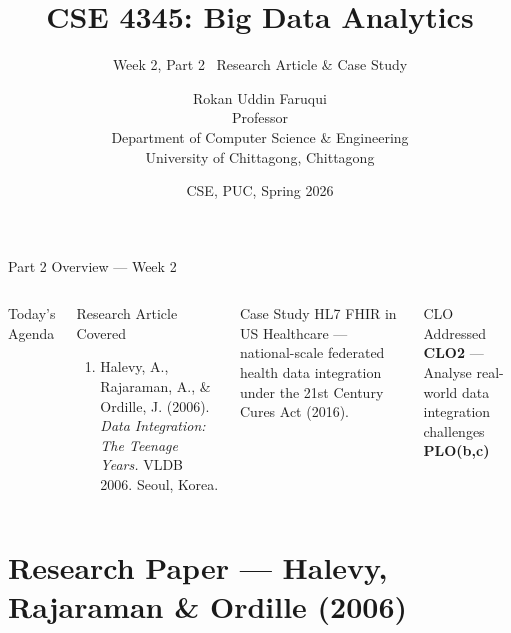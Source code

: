\documentclass[aspectratio=169,10pt]{beamer}
\title[CSE 4345 \textbar{} Week 2, Part 2]{CSE 4345: Big Data Analytics}
\subtitle{Week 2, Part 2 \textemdash\ Research Article \& Case Study}
\author[Dept.\ of CSE]{Rokan Uddin Faruqui \\ Professor \\ Department of Computer Science \& Engineering\\[4pt]
       \small University of Chittagong, Chittagong}
\institute{}
\date{CSE, PUC, Spring 2026}
\begin{document}

\begin{frame}
  \titlepage
\end{frame}

\begin{frame}{Part 2 Overview — Week 2}
  \begin{columns}[T]
      \begin{block}{Today's Agenda}
        \tableofcontents
      \end{block}

      \begin{exampleblock}{Research Article Covered}
        \begin{enumerate}
          \item Halevy, A., Rajaraman, A., \& Ordille, J. (2006).
                \textit{Data Integration: The Teenage Years.}
                VLDB 2006. Seoul, Korea.
        \end{enumerate}
      \end{exampleblock}
      \vspace{6pt}
      \begin{alertblock}{Case Study}
        HL7 FHIR in US Healthcare — national-scale federated health
        data integration under the 21st Century Cures Act (2016).
      \end{alertblock}
      \vspace{4pt}
      \begin{block}{CLO Addressed}
        \textbf{CLO2} — Analyse real-world data integration challenges\\
        \textbf{PLO(b,c)}
      \end{block}
  \end{columns}
\end{frame}

\section{Research Paper — Halevy, Rajaraman \& Ordille (2006)}
\end{document}
